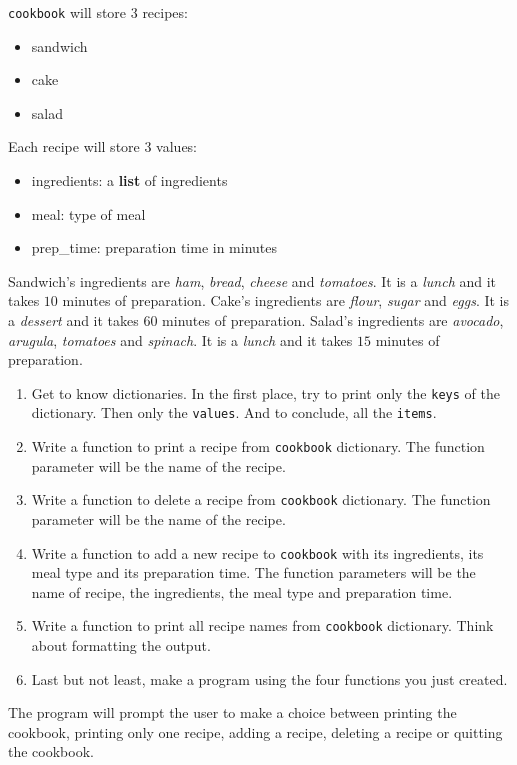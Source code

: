 \documentclass{42-en}
\begin{document}
\begin{42console}
\texttt{cookbook} will store 3 recipes:
\begin{itemize}
	\item sandwich
	\item cake
	\item salad
\end{itemize}

Each recipe will store 3 values:
\begin{itemize}
	\item ingredients: a \textbf{list} of ingredients
	\item meal: type of meal
	\item prep\_time: preparation time in minutes
\end{itemize}

Sandwich's ingredients are \textit{ham}, \textit{bread}, \textit{cheese} and \textit{tomatoes}.
It is a \textit{lunch} and it takes $10$ minutes of preparation.  
Cake's ingredients are \textit{flour}, \textit{sugar} and \textit{eggs}.
It is a \textit{dessert} and it takes $60$ minutes of preparation.  
Salad's ingredients are \textit{avocado}, \textit{arugula}, \textit{tomatoes} and \textit{spinach}.
It is a \textit{lunch} and it takes $15$ minutes of preparation.

\begin{enumerate}
	\item Get to know dictionaries. In the first place, try to print only the \texttt{keys} of the dictionary. Then only the \texttt{values}. And to conclude, all the \texttt{items}.
	\item Write a function to print a recipe from \texttt{cookbook} dictionary. The function parameter will be the name of the recipe.
	\item Write a function to delete a recipe from \texttt{cookbook} dictionary. The function parameter will be the name of the recipe.
	\item Write a function to add a new recipe to \texttt{cookbook} with its ingredients, its meal type and its preparation time. The function parameters will be the name of recipe, the ingredients, the meal type and preparation time.
	\item Write a function to print all recipe names from \texttt{cookbook} dictionary. Think about formatting the output.
	\item Last but not least, make a program using the four functions you just created.
\end{enumerate}

The program will prompt the user to make a choice between printing the cookbook, printing only one recipe, adding a recipe, deleting a recipe or quitting the cookbook.



\end{42console}
\end{document}
